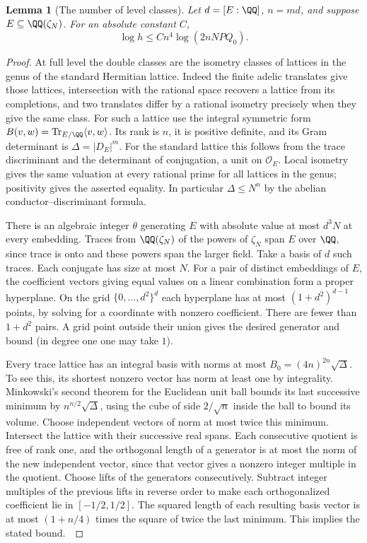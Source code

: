 \documentclass[a4paper,11pt]{article}
\newtheorem{lemma}[proposition]{Lemma}
\theoremstyle{definition}
\theoremstyle{remark}
\numberwithin{equation}{section}
\newcommand{\OO}{\mathcal O}
\begin{document}
\begin{lemma}[The number of level classes]\label{lem:mass32}
Let \(d=[E:\QQ]\), \(n=md\), and suppose \(E\subseteq\QQ(\zeta_N)\). For an absolute constant \(C\),
\[
                  \log h\le C n^4\log(2nNPQ_0).
\]
\end{lemma}
\begin{proof}
At full level the double classes are the isometry classes of lattices in the genus of the standard Hermitian lattice. Indeed the finite adelic translates give those lattices, intersection with the rational space recovers a lattice from its completions, and two translates differ by a rational isometry precisely when they give the same class. For such a lattice use the integral symmetric form \(B(v,w)=\operatorname{Tr}_{E/\QQ}\langle v,w\rangle\). Its rank is \(n\), it is positive definite, and its Gram determinant is \(\Delta=|D_E|^m\). For the standard lattice this follows from the trace discriminant and the determinant of conjugation, a unit on \(\OO_E\). Local isometry gives the same valuation at every rational prime for all lattices in the genus; positivity gives the asserted equality. In particular \(\Delta\le N^n\) by the abelian conductor--discriminant formula.

There is an algebraic integer \(\theta\) generating \(E\) with absolute value at most \(d^3N\) at every embedding. Traces from \(\QQ(\zeta_N)\) of the powers of \(\zeta_N\) span \(E\) over \(\QQ\), since trace is onto and these powers span the larger field. Take a basis of \(d\) such traces. Each conjugate has size at most \(N\). For a pair of distinct embeddings of \(E\), the coefficient vectors giving equal values on a linear combination form a proper hyperplane. On the grid \(\{0,\ldots,d^2\}^d\) each hyperplane has at most \((1+d^2)^{d-1}\) points, by solving for a coordinate with nonzero coefficient. There are fewer than \(1+d^2\) pairs. A grid point outside their union gives the desired generator and bound (in degree one one may take \(1\)).

Every trace lattice has an integral basis with norms at most \(B_0=(4n)^{2n}\sqrt\Delta\). To see this, its shortest nonzero vector has norm at least one by integrality. Minkowski's second theorem for the Euclidean unit ball bounds its last successive minimum by \(n^{n/2}\sqrt\Delta\), using the cube of side \(2/\sqrt n\) inside the ball to bound its volume. Choose independent vectors of norm at most twice this minimum. Intersect the lattice with their successive real spans. Each consecutive quotient is free of rank one, and the orthogonal length of a generator is at most the norm of the new independent vector, since that vector gives a nonzero integer multiple in the quotient. Choose lifts of the generators consecutively. Subtract integer multiples of the previous lifts in reverse order to make each orthogonalized coefficient lie in \([-1/2,1/2]\). The squared length of each resulting basis vector is at most \((1+n/4)\) times the square of twice the last minimum. This implies the stated bound.~\cite[Thm.~6.3.3]{XXIII-XVIII-IV-minima32}


\end{proof}
\end{document}
